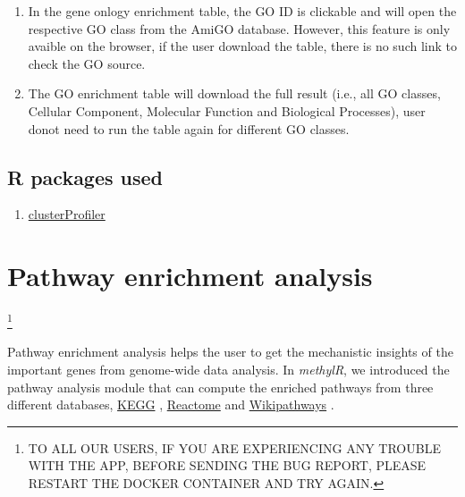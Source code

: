 \documentclass[
  a4paper,
  DIV=11,
  numbers=noendperiod,
  oneside,
  open=any]{scrreport}
\providecommand{\tightlist}{%
  \setlength{\itemsep}{0pt}\setlength{\parskip}{0pt}}\usepackage{longtable,booktabs,array}
\begin{document}
\begin{tcolorbox}[enhanced jigsaw, breakable, colback=white, colbacktitle=quarto-callout-warning-color!10!white, opacityback=0, left=2mm, bottomrule=.15mm, opacitybacktitle=0.6, coltitle=black, bottomtitle=1mm, toprule=.15mm, toptitle=1mm, arc=.35mm, titlerule=0mm, rightrule=.15mm, title=\textcolor{quarto-callout-warning-color}{\faExclamationTriangle}\hspace{0.5em}{Warning}, colframe=quarto-callout-warning-color-frame, leftrule=.75mm]

\begin{enumerate}
\def\labelenumi{\arabic{enumi}.}
\tightlist
\item
  In the gene onlogy enrichment table, the GO ID is clickable and will
  open the respective GO class from the AmiGO database. However, this
  feature is only avaible on the browser, if the user download the
  table, there is no such link to check the GO source.
\item
  The GO enrichment table will download the full result (i.e., all GO
  classes, Cellular Component, Molecular Function and Biological
  Processes), user donot need to run the table again for different GO
  classes.
\end{enumerate}

\end{tcolorbox}

\section{R packages used}\label{r-packages-used-4}

\begin{enumerate}
\def\labelenumi{\arabic{enumi}.}
\tightlist
\item
  \href{https://bioconductor.org/packages/release/bioc/vignettes/clusterProfiler/inst/doc/clusterProfiler.html}{clusterProfiler}
\end{enumerate}

\chapter{Pathway enrichment analysis}\label{sec-pathway}

\footnote{TO ALL OUR USERS, IF YOU ARE EXPERIENCING ANY TROUBLE WITH THE
  APP, BEFORE SENDING THE BUG REPORT, PLEASE RESTART THE DOCKER
  CONTAINER AND TRY AGAIN.}

Pathway enrichment analysis helps the user to get the mechanistic
insights of the important genes from genome-wide data analysis. In
\emph{methylR}, we introduced the pathway analysis module that can
compute the enriched pathways from three different databases,
\href{https://www.genome.jp/kegg/}{KEGG} \autocite{Kanehisa2000},
\href{https://reactome.org/}{Reactome} \autocite{Gillespie2021} and
\href{https://www.wikipathways.org/}{Wikipathways}
\autocite{pico2008plos,martens2020nar}.
\end{document}
